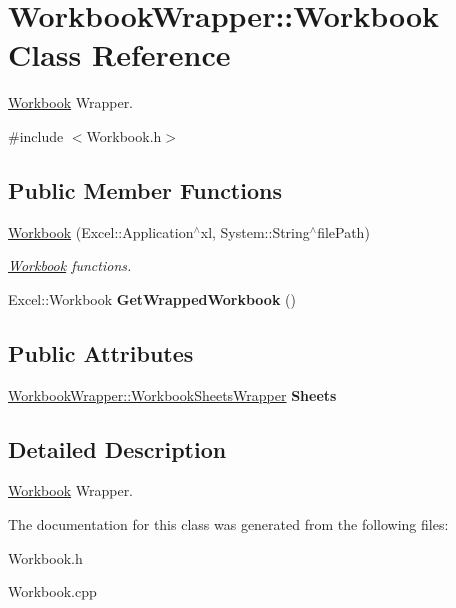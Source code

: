 \hypertarget{class_workbook_wrapper_1_1_workbook}{}\section{Workbook\+Wrapper\+:\+:Workbook Class Reference}
\label{class_workbook_wrapper_1_1_workbook}


\hyperlink{class_workbook_wrapper_1_1_workbook}{Workbook} Wrapper.  




{\ttfamily \#include $<$Workbook.\+h$>$}

\subsection*{Public Member Functions}
\begin{DoxyCompactItemize}
\item 
\hypertarget{class_workbook_wrapper_1_1_workbook_a3c912e843627d6fde920e313d16047e1}{}\hyperlink{class_workbook_wrapper_1_1_workbook_a3c912e843627d6fde920e313d16047e1}{Workbook} (Excel\+::\+Application$^\wedge$xl, System\+::\+String$^\wedge$file\+Path)\label{class_workbook_wrapper_1_1_workbook_a3c912e843627d6fde920e313d16047e1}

\begin{DoxyCompactList}\small\item\em \hyperlink{class_workbook_wrapper_1_1_workbook}{Workbook} functions. \end{DoxyCompactList}\item 
\hypertarget{class_workbook_wrapper_1_1_workbook_a49c8dbf1671b694e30a29cd28b7d54a2}{}Excel\+::\+Workbook {\bfseries Get\+Wrapped\+Workbook} ()\label{class_workbook_wrapper_1_1_workbook_a49c8dbf1671b694e30a29cd28b7d54a2}

\end{DoxyCompactItemize}
\subsection*{Public Attributes}
\begin{DoxyCompactItemize}
\item 
\hypertarget{class_workbook_wrapper_1_1_workbook_a0f75222149a6f584ecad7c20433723d0}{}\hyperlink{class_workbook_wrapper_1_1_workbook_sheets_wrapper}{Workbook\+Wrapper\+::\+Workbook\+Sheets\+Wrapper} {\bfseries Sheets}\label{class_workbook_wrapper_1_1_workbook_a0f75222149a6f584ecad7c20433723d0}

\end{DoxyCompactItemize}


\subsection{Detailed Description}
\hyperlink{class_workbook_wrapper_1_1_workbook}{Workbook} Wrapper. 

The documentation for this class was generated from the following files\+:\begin{DoxyCompactItemize}
\item 
Workbook.\+h\item 
Workbook.\+cpp\end{DoxyCompactItemize}
